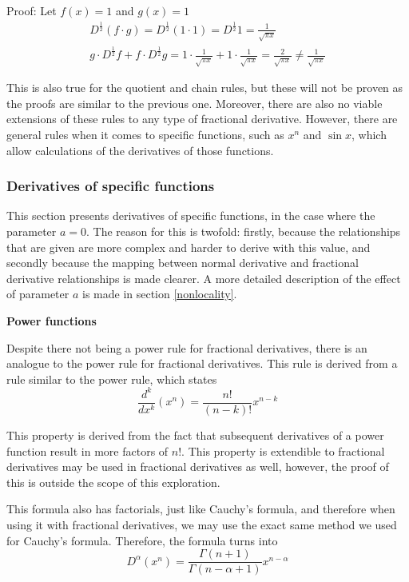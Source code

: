 \documentclass{article}
\begin{document}
Proof: Let $f(x) = 1$ and $g(x) = 1$
\begin{gather*}
	D^\frac{1}{2} \left(f \cdot g\right) = D^\frac{1}{2} \left(1 \cdot 1\right) = D^\frac{1}{2} 1 = \frac{1}{\sqrt{\pi x}} \\
	g \cdot D^\frac{1}{2} f + f \cdot D^\frac{1}{2} g = 1 \cdot \frac{1}{\sqrt{\pi x}} + 1 \cdot \frac{1}{\sqrt{\pi x}} = \frac{2}{\sqrt{\pi x}} \neq \frac{1}{\sqrt{\pi x}}
\end{gather*}

This is also true for the quotient and chain rules, but these will not be
proven as the proofs are similar to the previous one. Moreover, there are also
no viable extensions of these rules to any type of fractional
derivative. However, there are general rules when it comes to specific
functions, such as $x^n$ and $\sin x$, which allow calculations of the
derivatives of those functions.

\subsubsection{Derivatives of specific functions} \label{der_examples}

This section presents derivatives of specific functions, in the case where the
parameter $a=0$. The reason for this is twofold: firstly, because the
relationships that are given are more complex and harder to derive with this
value, and secondly because the mapping between normal derivative and
fractional derivative relationships is made clearer. A more detailed
description of the effect of parameter $a$ is made in section
\ref{nonlocality}.

\textbf{Power functions}

Despite there not being a power rule for fractional derivatives, there is an
analogue to the power rule for fractional derivatives. This rule is derived from
a rule similar to the power rule, which states
$$
\frac{d^k}{dx^k} \left(x^n\right) = \frac{n!}{\left(n-k\right)!} x^{n-k}
$$

This property is derived from the fact that subsequent derivatives of a power
function result in more factors of $n!$. This property is extendible to
fractional derivatives may be used in fractional derivatives as well, however,
the proof of this is outside the scope of this exploration.

This formula also has factorials, just like Cauchy's formula, and therefore
when using it with fractional derivatives, we may use the exact same method we
used for Cauchy's formula. Therefore, the formula turns into
$$
D^\alpha \left(x^n\right) = \frac{\Gamma(n+1)}{\Gamma(n-\alpha + 1)} x^{n-\alpha}
$$
\end{document}
